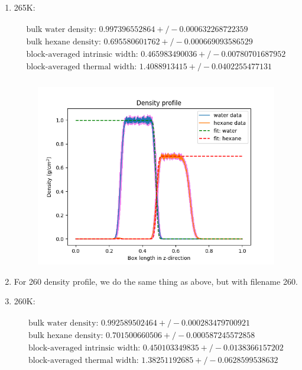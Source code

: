 \documentclass[12pt,reqno]{amsart}
\numberwithin{equation}{section}
\begin{document}
\begin{enumerate}
\item 265K: 

\begin{align}
\begin{split}
\text{bulk water density: } 0.997396552864  +/- 0.000632268722359 \\
\text{bulk hexane density: } 0.695580601762  +/- 0.000669093586529\\
\text{block-averaged intrinsic width: }  0.465983490036 +/- 0.00780701687952\\
\text{block-averaged thermal width: } 1.4088913415  +/- 0.0402255477131 \\
\end{split}
\end{align} 

\begin{figure}[H]
\centering
\includegraphics[scale=0.6]{interface_density_profile_full-265-1bead}
\end{figure}

\item For 260 density profile, we do the same thing as above, but with filename 260.  

\item 260K: 

\begin{align}
\begin{split}
\text{bulk water density: } 0.992589502464  +/- 0.000283479700921 \\
\text{bulk hexane density: } 0.701500660506  +/- 0.000587245572858\\
\text{block-averaged intrinsic width: }  0.450103349835 +/- 0.0138366157202\\
\text{block-averaged thermal width: } 1.38251192685  +/- 0.0628599538632 \\
\end{split}
\end{align} 


\end{enumerate}
\end{document}
